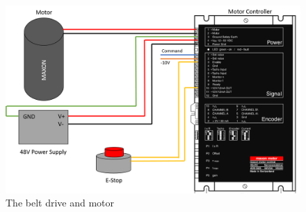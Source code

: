 \documentclass[12pt]{report}
\begin{document}
		
	\begin{figure}[h] 
		\centering
		\includegraphics[width=0.9\linewidth]{Motor_setup}
		\caption{The belt drive and motor}
		\label{fig:actuator}
	\end{figure}
		
	
	
\end{document}
